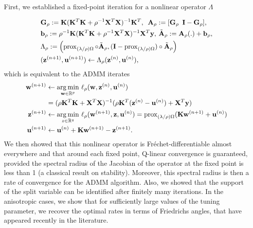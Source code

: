 First, we established a
fixed-point iteration for a nonlinear operator $\Lambda$ %
    
  \begin{eqnarray}
    \begin{aligned}
      &\mathbf{G}_{\rho} :=
      \mathbf{K}(\mathbf{K}^T\mathbf{K} + \rho^{-1}\mathbf{X}^T\mathbf{X})^{-1}\mathbf{K}^T,\hspace{.5em}
      \mathbf{A}_{\rho}:=[\mathbf{G}_{\rho}\hspace{.5em}\mathbf{I}-\mathbf{G}_{\rho}],\\
      &\mathbf{b}_{\rho} := \rho^{-1}\mathbf{K}(\mathbf{K}^T\mathbf{K} +
      \rho^{-1}\mathbf{X}^T\mathbf{X})^{-1}\mathbf{X}^T\mathbf{y},\hspace{.2em}\tilde{\mathbf{A}}_{\rho} :=
      \mathbf{A}_{\rho}(.) +  \mathbf{b}_{\rho},\\
      &\Lambda_{\rho} :=
        \left(\operatorname{prox}_{(\lambda/\rho)\Omega}\circ\tilde{\mathbf{A}}_{\rho},
        (\mathbf{I}-\operatorname{prox}_{(\lambda/\rho)\Omega})\circ\tilde{\mathbf{A}}_{\rho}\right)\\
        &(\mathbf{z}^{(n+1)}, \mathbf{u}^{(n+1)}) \leftarrow
        \Lambda_{\rho}(\mathbf{z}^{(n)}, \mathbf{u}^{(n)}),
    \end{aligned}
    \label{eq:factorize}
  \end{eqnarray}
which is equivalent to the ADMM iterates
\begin{eqnarray}
    \begin{split}
      \mathbf{w}^{(n+1)} &\leftarrow
      \underset{\mathbf{w} \in \mathbb R^p}{\operatorname*{arg\,min}}\text{ }\ell_{\rho}(\mathbf{w}, \mathbf{z}^{(n)},
      \mathbf{u}^{(n)}) \\
      &= (\rho \mathbf{K}^T\mathbf{K} + \mathbf{X}^T\mathbf{X})^{-1}(\rho\mathbf{K}^T(\mathbf{z}^{(n)} -
      \mathbf{u}^{(n)}) + \mathbf{X}^T\mathbf{y})\\
      \mathbf{z}^{(n+1)} &\leftarrow \underset{z \in \mathbb R^q}{\operatorname*{arg\,min}}\text{ }\ell_{\rho}(\mathbf{w}^{(n+1)},\mathbf{z}, \mathbf{u}^{(n)}) =
      \operatorname{prox}_{(\lambda/\rho)\Omega}(\mathbf{K}\mathbf{w}^{(n+1)} + \mathbf{u}^{(n)})\\
      \mathbf{u}^{(n+1)} &\leftarrow \mathbf{u}^{(n)} + \mathbf{K}\mathbf{w}^{(n+1)} -\mathbf{z}^{(n+1)}.
    \end{split}
\label{eq:admm}
\end{eqnarray}
We then showed that this nonlinear operator is
Fr\'echet-differentiable almost everywhere and that around each fixed
point, Q-linear convergence is guaranteed, provided the spectral
radius of the Jacobian of the operator at the fixed point is less than
1 (a classical result on stability). Moreover, this spectral radius is
then a rate of convergence for the ADMM algorithm. Also, we showed that
the support of the split variable can be identified after finitely
many iterations. In the anisotropic cases, we show that for
sufficiently large values of the tuning parameter, we recover the
optimal rates in terms of Friedrichs angles, that have appeared
recently in the literature.

